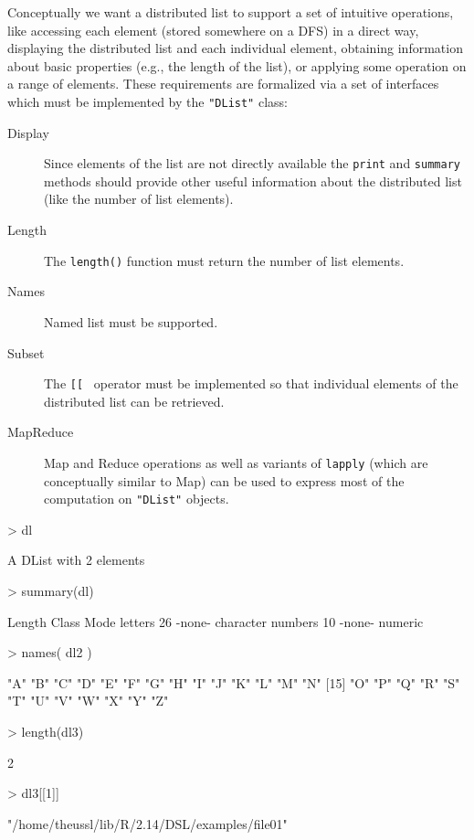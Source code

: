 \documentclass[fleqn]{article}
\let\code=\texttt
\newcommand{\class}[1]{\code{"#1"}}
\begin{document}
Conceptually we want a distributed list to support a set
of intuitive operations, like accessing each element (stored somewhere
on a DFS) in a direct way,
displaying the distributed list and each individual
element, obtaining information about basic properties (e.g., the
length of the list), or applying some operation on a
range of elements. These requirements are formalized via a set of
interfaces which must be implemented by the \class{DList} class:
\begin{description}
\item[Display] Since elements of the list are not directly available
  the \code{print} and \code{summary} methods should provide other
  useful information about the distributed list (like the number of
  list elements).
\item[Length] The \code{length()} function must return the number of
  list elements.
\item[Names] Named list must be supported.
\item[Subset] The \code{[[}%
  \ operator must be implemented so that individual elements of the
  distributed list can be retrieved.
\item[MapReduce] Map and Reduce operations as well as variants of
  \code{lapply} (which are conceptually similar to Map) can be used to
  express most of the computation on \class{DList} objects.
\end{description}

\begin{Schunk}
\begin{Sinput}
> dl
\end{Sinput}
\begin{Soutput}
A DList with 2 elements
\end{Soutput}
\begin{Sinput}
> summary(dl)
\end{Sinput}
\begin{Soutput}
        Length Class  Mode     
letters 26     -none- character
numbers 10     -none- numeric  
\end{Soutput}
\begin{Sinput}
> names( dl2 )
\end{Sinput}
\begin{Soutput}
 [1] "A" "B" "C" "D" "E" "F" "G" "H" "I" "J" "K" "L" "M" "N"
[15] "O" "P" "Q" "R" "S" "T" "U" "V" "W" "X" "Y" "Z"
\end{Soutput}
\begin{Sinput}
> length(dl3)
\end{Sinput}
\begin{Soutput}
[1] 2
\end{Soutput}
\begin{Sinput}
> dl3[[1]]
\end{Sinput}
\begin{Soutput}
[1] "/home/theussl/lib/R/2.14/DSL/examples/file01"
\end{Soutput}
\end{Schunk}
\end{document}
